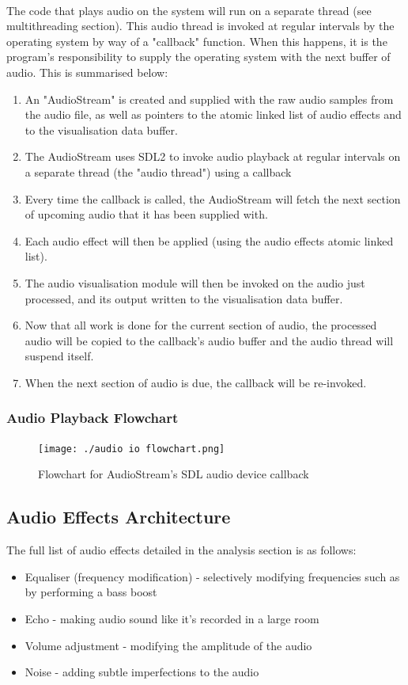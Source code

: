 \paragraph{}
The code that plays audio on the system will run on a separate thread (see multithreading section). This audio thread is invoked at regular intervals by the operating system by way of a "callback" function. When this happens, it is the program's responsibility to supply the operating system with the next buffer of audio. This is summarised below:

\begin{enumerate}
	\item An "AudioStream" is created and supplied with the raw audio samples from the audio file, as well as pointers to the atomic linked list of audio effects and to the visualisation data buffer.
	\item The AudioStream uses SDL2 to invoke audio playback at regular intervals on a separate thread (the "audio thread") using a callback
	\item Every time the callback is called, the AudioStream will fetch the next section of upcoming audio that it has been supplied with.
	\item Each audio effect will then be applied (using the audio effects atomic linked list).
	\item The audio visualisation module will then be invoked on the audio just processed, and its output written to the visualisation data buffer.
	\item Now that all work is done for the current section of audio, the processed audio will be copied to the callback's audio buffer and the audio thread will suspend itself.
	\item When the next section of audio is due, the callback will be re-invoked.
\end{enumerate}

\subsubsection { Audio Playback Flowchart }
\begin{figure}[H]
	\texttt{[image: ./audio io flowchart.png]}
	\caption{Flowchart for AudioStream's SDL audio device callback}
\end{figure}

\pagebreak

\subsection{Audio Effects Architecture}
The full list of audio effects detailed in the analysis section is as follows:
\begin{itemize}
	\item Equaliser (frequency modification) - selectively modifying frequencies such as by performing a bass boost
	\item Echo - making audio sound like it's recorded in a large room
	\item Volume adjustment - modifying the amplitude of the audio
	\item Noise - adding subtle imperfections to the audio
\end{itemize}

